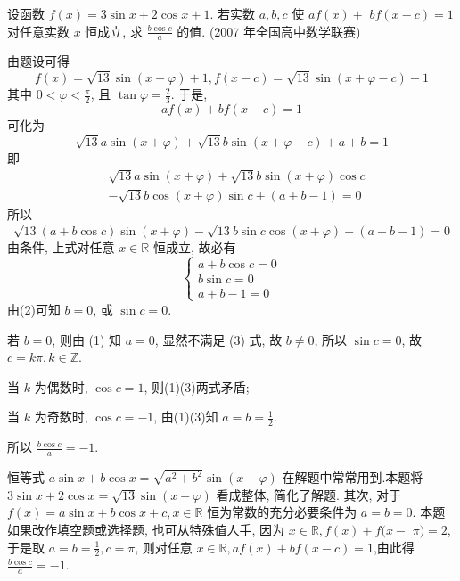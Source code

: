 \begin{example}
	设函数 $f(x)=3 \sin x+2 \cos x+1$. 若实数 $a ,  b ,  c$ 使 $a f(x)+$ $b f(x-c)=1$ 对任意实数 $x$ 恒成立, 求 $\frac{b \cos c}{a}$ 的值. (2007 年全国高中数学联赛)
\end{example}
\begin{solution}
	由题设可得
	$$
		f(x)=\sqrt{13} \sin (x+\varphi)+1, f(x-c)=\sqrt{13} \sin (x+\varphi-c)+1
	$$
	其中 $0<\varphi<\frac{\pi}{2}$, 且 $\tan \varphi=\frac{2}{3}$. 于是,
	$$
		a f(x)+b f(x-c)=1
	$$
	可化为
	$$
		\sqrt{13} a \sin (x+\varphi)+\sqrt{13} b \sin (x+\varphi-c)+a+b=1
	$$
	即
	$$
		\begin{aligned}
			 & \sqrt{13} a \sin (x+\varphi)+\sqrt{13} b \sin (x+\varphi) \cos c \\
			 & -\sqrt{13} b \cos (x+\varphi) \sin c+(a+b-1)=0
		\end{aligned}
	$$
	所以
	$$
		\sqrt{13}(a+b \cos c) \sin (x+\varphi)-\sqrt{13} b \sin c \cos (x+\varphi)+(a+b-1)=0
	$$
	由条件, 上式对任意 $x \in \mathbb{R}$ 恒成立, 故必有
	\[
		\left\{\begin{array}{l}
			a+b \cos c=0  \tag{1} \\
			b \sin c=0            \\
			a+b-1=0
		\end{array}\right.
	\]
	由(2)可知 $b=0$, 或 $\sin c=0$.

	若 $b=0$, 则由 (1) 知 $a=0$, 显然不满足 (3) 式, 故 $b \neq 0$, 所以 $\sin c=0$, 故 $c=k \pi, k \in \mathbb{Z}$.

	当 $k$ 为偶数时, $\cos c=1$, 则(1)(3)两式矛盾;

	当 $k$ 为奇数时, $\cos c=-1$, 由(1)(3)知 $a=b=\frac{1}{2}$.

	所以 $\frac{b \cos c}{a}=-1$.
\end{solution}
\begin{note}
	恒等式 $a \sin x+b \cos x=\sqrt{a^{2}+b^{2}} \sin (x+\varphi)$ 在解题中常常用到.本题将 $3 \sin x+2 \cos x=\sqrt{13} \sin (x+\varphi)$ 看成整体, 简化了解题. 其次, 对于 $f(x)=a \sin x+b \cos x+c, x \in \mathbb{R}$ 恒为常数的充分必要条件为 $a=b=0$. 本题如果改作填空题或选择题, 也可从特殊值人手, 因为 $x \in \mathbb{R}, f(x)+f(x-$ $\pi)=2$, 于是取 $a=b=\frac{1}{2}, c=\pi$, 则对任意 $x \in \mathbb{R}, a f(x)+b f(x-c)=1$,由此得 $\frac{b \cos c}{a}=-1$.
\end{note}

